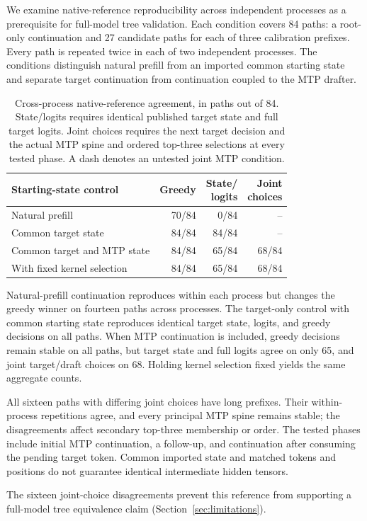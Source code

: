 We examine native-reference reproducibility across independent processes as a prerequisite for full-model tree validation. Each condition covers 84 paths: a root-only continuation and 27 candidate paths for each of three calibration prefixes. Every path is repeated twice in each of two independent processes. The conditions distinguish natural prefill from an imported common starting state and separate target continuation from continuation coupled to the MTP drafter.

\begin{table}[t]
\caption{Cross-process native-reference agreement, in paths out of 84. State/logits requires identical published target state and full target logits. Joint choices requires the next target decision and the actual MTP spine and ordered top-three selections at every tested phase. A dash denotes an untested joint MTP condition.}
\label{tab:native-continuation}
\centering\footnotesize
\setlength{\tabcolsep}{3pt}
\begin{tabularx}{\columnwidth}{@{}Xrrr@{}}
\toprule
Starting-state control & Greedy & \shortstack{State/\\logits} & \shortstack{Joint\\choices} \\
\midrule
Natural prefill & 70/84 & 0/84 & -- \\
Common target state & 84/84 & 84/84 & -- \\
Common target and MTP state & 84/84 & 65/84 & 68/84 \\
\quad With fixed kernel selection & 84/84 & 65/84 & 68/84 \\
\bottomrule
\end{tabularx}
\end{table}

Natural-prefill continuation reproduces within each process but changes the greedy winner on fourteen paths across processes. The target-only control with common starting state reproduces identical target state, logits, and greedy decisions on all paths. When MTP continuation is included, greedy decisions remain stable on all paths, but target state and full logits agree on only 65, and joint target/draft choices on 68. Holding kernel selection fixed yields the same aggregate counts.

All sixteen paths with differing joint choices have long prefixes. Their within-process repetitions agree, and every principal MTP spine remains stable; the disagreements affect secondary top-three membership or order. The tested phases include initial MTP continuation, a follow-up, and continuation after consuming the pending target token. Common imported state and matched tokens and positions do not guarantee identical intermediate hidden tensors.

The sixteen joint-choice disagreements prevent this reference from supporting a full-model tree equivalence claim (Section~\ref{sec:limitations}).
